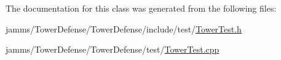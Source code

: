 The documentation for this class was generated from the following files\+:\begin{DoxyCompactItemize}
\item 
jamms/\+Tower\+Defense/\+Tower\+Defense/include/test/\hyperlink{_tower_test_8h}{Tower\+Test.\+h}\item 
jamms/\+Tower\+Defense/\+Tower\+Defense/test/\hyperlink{_tower_test_8cpp}{Tower\+Test.\+cpp}\end{DoxyCompactItemize}
